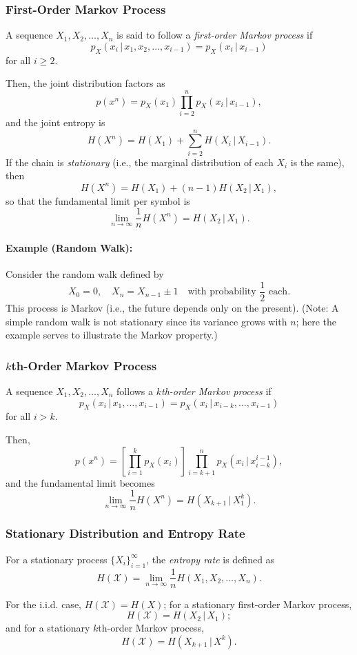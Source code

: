 \subsubsection{First-Order Markov Process}
\begin{definition}
A sequence \(X_1, X_2, \dots, X_n\) is said to follow a \emph{first-order Markov process} if
\[
p_X(x_i\,|\, x_1,x_2,\dots,x_{i-1}) = p_X(x_i\,|\, x_{i-1})
\]
for all \(i \ge 2\).
\end{definition}
Then, the joint distribution factors as
\[
p(x^n) = p_X(x_1) \prod_{i=2}^{n} p_X(x_i \,|\, x_{i-1}),
\]
and the joint entropy is
\[
H(X^n) = H(X_1) + \sum_{i=2}^{n} H(X_i \,|\, X_{i-1}).
\]
If the chain is \emph{stationary} (i.e., the marginal distribution of each \(X_i\) is the same), then
\[
H(X^n) = H(X_1) + (n-1)H(X_2 \,|\, X_1),
\]
so that the fundamental limit per symbol is
\[
\lim_{n \to \infty} \frac{1}{n} H(X^n) = H(X_2 \,|\, X_1).
\]

\paragraph{Example (Random Walk):}  
Consider the random walk defined by
\[
X_0 = 0,\quad X_n = X_{n-1} \pm 1 \quad \text{with probability } \frac{1}{2} \text{ each}.
\]
This process is Markov (i.e., the future depends only on the present). (Note: A simple random walk is not stationary since its variance grows with \(n\); here the example serves to illustrate the Markov property.)

\subsubsection{\(k\)th-Order Markov Process}
\begin{definition}
A sequence \(X_1, X_2, \dots, X_n\) follows a \emph{\(k\)th-order Markov process} if
\[
p_X(x_i\,|\, x_1,\dots,x_{i-1}) = p_X(x_i\,|\, x_{i-k},\dots,x_{i-1})
\]
for all \(i > k\).
\end{definition}
Then,
\[
p(x^n) = \left[\prod_{i=1}^{k} p_X(x_i)\right] \prod_{i=k+1}^{n} p_X(x_i \,|\, x_{i-k}^{i-1}),
\]
and the fundamental limit becomes
\[
\lim_{n \to \infty}\frac{1}{n}H(X^n) = H(X_{k+1}\,|\, X_1^k).
\]

\subsubsection{Stationary Distribution and Entropy Rate}
\begin{definition}
For a stationary process \(\{X_i\}_{i=1}^{\infty}\), the \emph{entropy rate} is defined as
\[
H(\mathscr{X}) = \lim_{n\to\infty} \frac{1}{n} H(X_1,X_2,\dots,X_n).
\]
\end{definition}
For the i.i.d. case, \(H(\mathscr{X})=H(X)\); for a stationary first-order Markov process,
\[
H(\mathscr{X})=H(X_2\,|\, X_1);
\]
and for a stationary \(k\)th-order Markov process,
\[
H(\mathscr{X})=H(X_{k+1}\,|\, X^k).
\]

